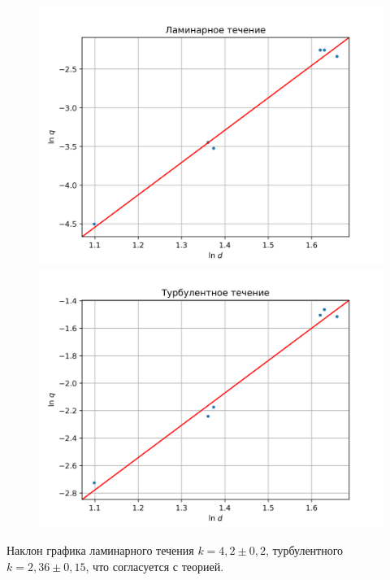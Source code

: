 \begin{figure}[ht!]
    \centering\includegraphics[width=0.8\linewidth]{img/lam.png}
    \centering\includegraphics[width=0.8\linewidth]{img/tur.png}
\end{figure}

Наклон графика ламинарного течения $k=4{,}2\pm 0{,}2$, турбулентного $k=2{,}36\pm 0{,}15$,
что согласуется с теорией.
